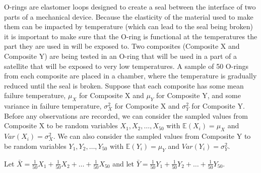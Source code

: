 \documentclass[addpoints]{examsetup}\usepackage[]{graphicx}\usepackage[]{color}
\begin{document}
\begin{questions}

\newpage

\question
O-rings are elastomer loops designed to create a seal between the interface of two parts of a mechanical device.
Because the elasticity of the material used to make them can be impacted by temperature (which can lead to the seal being broken) it is important to make sure that the O-ring is functional at the temperatures the part they are used in will be exposed to.
Two composites (Composite X and Composite Y) are being tested in an O-ring that will be used in a part of a satellite that will be exposed to very low temperatures.
A sample of 50 O-rings from each composite are placed in a chamber, where the temperature is gradually reduced until the seal is broken.
Suppose that each composite has some mean failure temperature, $\mu_X$ for Composite X and $\mu_Y$ for Composite Y, and some variance in failure temperature, 
$\sigma_X^2$ for Composite X and $\sigma_Y^2$ for Composite Y. 
Before any observations are recorded, we can consider the sampled values from Composite X to be random variables $X_1, X_2, \ldots, X_{50}$ with $\mathbb{E}(X_i) = \mu_X$ and $Var(X_i) = \sigma_X^2$.
We can also consider the sampled values from Composite Y to be random variables $Y_1, Y_2, \ldots, Y_{50}$ with $\mathbb{E}(Y_i) = \mu_Y$ and $Var(Y_i) = \sigma_Y^2$.

Let $\bar{X} = \frac{1}{50} X_1 + \frac{1}{50} X_2 + \ldots + \frac{1}{50} X_{50}$ and let $\bar{Y} = \frac{1}{50} Y_1 + \frac{1}{50} Y_2 + \ldots + \frac{1}{50} Y_{50}$.


\end{questions}
\end{document}
